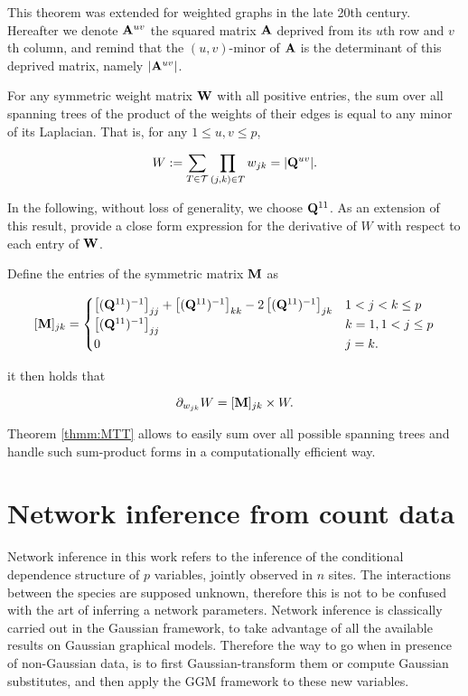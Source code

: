  This theorem was extended for weighted graphs in the late 20th century. Hereafter we denote ${\bf A}^{uv}$ the squared matrix ${\bf A}$ deprived from its $u$th row and $v$th column, and remind that the $(u, v)$-minor of ${\bf A}$ is the determinant of this deprived matrix, namely $|{\bf A}^{uv}|$.

\begin{theorem} \label{thmm:MTT}
    For any symmetric weight matrix ${\bf W}$ with all positive entries, the sum over all spanning trees of the product of the weights of their edges is equal to any minor of its Laplacian. That is, for any $1 \leq u, v \leq p$,
 
   \[
    W := \sum_{T\in\mathcal{T}} \prod_{(j, k)\in T} w_{jk} = |{\bf Q}^{uv}|.
    \]
   
\end{theorem}    

In the following, without loss of generality, we choose ${\bf Q}^{11}$. As an extension of this result, \cite{MeilaJaak} provide a close form expression for the derivative of $W$ with respect to each entry of ${\bf W}$. 

\begin{lemma}  \label{lemm:Meila}
    Define the entries of the symmetric matrix ${\bf M}$ as
 
\[    
 [{\bf M}]_{jk} =\begin{cases}
    \left[({\bf Q}^{11})^{-1}\right]_{jj} + \left[({\bf Q}^{11})^{-1}\right]_{kk} -2\left[({\bf Q}^{11})^{-1}\right]_{jk} & 1< j<k \leq p\\
    \left[({\bf Q}^{11})^{-1}\right]_{jj} & k=1, 1< j \leq p  \\
    0 &  j=k .
    \end{cases}
\]
 
it then holds that
 
$$
\partial_{w_{jk}} W = [{\bf M}]_{jk}  \times W.
$$
\end{lemma}

Theorem \ref{thmm:MTT} allows to easily sum over all possible spanning trees and handle such sum-product forms in a computationally efficient way.  


\section{Network inference from count data}
  Network inference  in this work refers to the inference of the conditional dependence structure of $p$ variables, jointly observed in $n$ sites. The interactions between the species are supposed unknown, therefore this is not to be confused with the art of inferring a network parameters. Network inference is classically carried out in the Gaussian framework, to take advantage of all the available results on Gaussian graphical models. Therefore the way to go when in presence of non-Gaussian data, is to first Gaussian-transform them or compute Gaussian substitutes, and then apply the GGM framework to these new variables.
  
